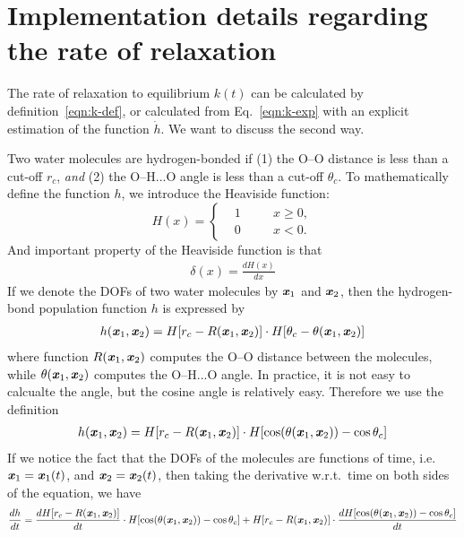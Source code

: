 \documentclass[unsortedaddress,a4paper,onecolumn]{revtex4}
\newcommand{\vect}[1]{\textbf{\textit{#1}}}
\begin{document}
\section{Implementation details regarding the rate of relaxation}

The rate of relaxation to equilibrium $k(t)$ can be calculated by
definition~\eqref{eqn:k-def}, or calculated from Eq.~\eqref{eqn:k-exp}
with an explicit estimation of the function $\dot h$. We want to discuss the second way.

Two water molecules are hydrogen-bonded if (1) the O--O distance is less than a cut-off $r_c$, \emph{and} (2)
the O--H...O angle is less than a cut-off $\theta_c$. To mathematically define the function $h$, we introduce
the Heaviside function:
\begin{equation}\label{eqn:heavi}
  H(x) =
  \left\{
    \begin{alignedat}{3}
      &1 &\quad& x\geq0, \\
      &0 &     & x < 0.
    \end{alignedat}
  \right.
\end{equation}
And important property of the Heaviside function is that
\begin{align}
  \delta (x) = \frac{dH(x)}{dx}
\end{align}
If we denote the DOFs of two water molecules by $\vect x_1$ and $\vect x_2$, then the hydrogen-bond population function $h$ is expressed by
\begin{align}
  h(\vect x_1, \vect x_2) = H [r_c - R(\vect x_1, \vect x_2)] \cdot H [\theta_c - \theta(\vect x_1, \vect x_2)]
\end{align}
where function $R(\vect x_1, \vect x_2)$ computes the O--O distance
between the molecules, while $\theta(\vect x_1, \vect x_2)$ computes
the O--H...O angle. In practice, it is not easy to calcualte the
angle, but the cosine angle is relatively easy. Therefore we use the
definition 
\begin{align}
  h(\vect x_1, \vect x_2) = H [r_c - R(\vect x_1, \vect x_2)] \cdot H[\cos(\theta(\vect x_1, \vect x_2)) - \cos \theta_c]
\end{align}
If we notice the fact that the DOFs of the molecules are functions of
time, i.e.~$\vect x_1 = \vect x_1(t)$, and $\vect x_2 = \vect x_2(t)$, then
taking the derivative w.r.t.~time on both sides of the equation, we have
\begin{align}
  \frac{d h}{dt}
  =
  \frac{dH [r_c - R(\vect x_1, \vect x_2)]}{dt} \cdot H[\cos(\theta(\vect x_1, \vect x_2)) - \cos \theta_c] +
  H [r_c - R(\vect x_1, \vect x_2)] \cdot \frac{dH[\cos(\theta(\vect x_1, \vect x_2)) - \cos \theta_c]}{dt}
\end{align}
\end{document}
